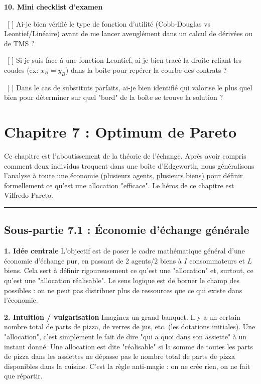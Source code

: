 \documentclass[11pt, a4paper]{report}
\begin{document}
\textbf{10. Mini checklist d'examen}
\par \textbullet\ [ ] Ai-je bien vérifié le type de fonction d'utilité (Cobb-Douglas vs Leontief/Linéaire) avant de me lancer aveuglément dans un calcul de dérivées ou de TMS ?
\par \textbullet\ [ ] Si je suis face à une fonction Leontief, ai-je bien tracé la droite reliant les coudes (ex: $x_B = y_B$) dans la boîte pour repérer la courbe des contrats ?
\par \textbullet\ [ ] Dans le cas de substituts parfaits, ai-je bien identifié qui valorise le plus quel bien pour déterminer sur quel "bord" de la boîte se trouve la solution ?
\newpage
\chapter{Chapitre 7 : Optimum de Pareto}

Ce chapitre est l'aboutissement de la théorie de l'échange. Après avoir compris comment deux individus troquent dans une boîte d'Edgeworth, nous généralisons l'analyse à toute une économie (plusieurs agents, plusieurs biens) pour définir formellement ce qu'est une allocation "efficace". Le héros de ce chapitre est Vilfredo Pareto.

\vspace{1cm}\hrule\vspace{1cm}

\section{Sous-partie 7.1 : Économie d'échange générale}

\textbf{1. Idée centrale}
L'objectif est de poser le cadre mathématique général d'une économie d'échange pur, en passant de 2 agents/2 biens à $I$ consommateurs et $L$ biens. Cela sert à définir rigoureusement ce qu'est une "allocation" et, surtout, ce qu'est une "allocation réalisable". Le sens logique est de borner le champ des possibles : on ne peut pas distribuer plus de ressources que ce qui existe dans l'économie.

\textbf{2. Intuition / vulgarisation}
Imaginez un grand banquet. Il y a un certain nombre total de parts de pizza, de verres de jus, etc. (les dotations initiales). Une "allocation", c'est simplement le fait de dire "qui a quoi dans son assiette" à un instant donné. Une allocation est dite "réalisable" si la somme de toutes les parts de pizza dans les assiettes ne dépasse pas le nombre total de parts de pizza disponibles dans la cuisine. C'est la règle anti-magie : on ne crée rien, on ne fait que répartir.
\end{document}
